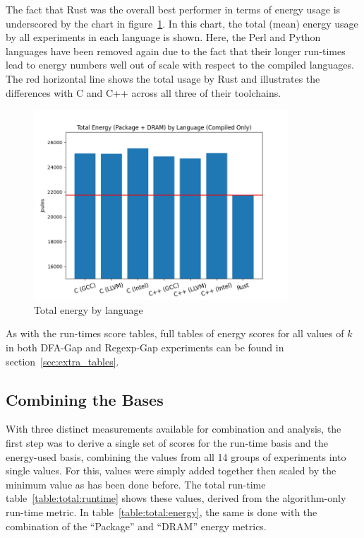 The fact that Rust was the overall best performer in terms of energy usage is underscored by the chart in figure~\ref{fig:graph:total_power_usage}. In this chart, the total (mean) energy usage by all experiments in each language is shown. Here, the Perl and Python languages have been removed again due to the fact that their longer run-times lead to energy numbers well out of scale with respect to the compiled languages. The red horizontal line shows the total usage by Rust and illustrates the differences with C and C++ across all three of their toolchains.

\begin{figure}[h]
	\centering
    \includegraphics[width=0.85\textwidth]{figures/total_power_usage.png}
    \caption{Total energy by language}
    \label{fig:graph:total_power_usage}
\end{figure}

As with the run-times score tables, full tables of energy scores for all values of $k$ in both DFA-Gap and Regexp-Gap experiments can be found in section~\ref{sec:extra_tables}.

\subsection{Combining the Bases}
\label{subsec:combined}

With three distinct measurements available for combination and analysis, the first step was to derive a single set of scores for the run-time basis and the energy-used basis, combining the values from all 14 groups of experiments into single values. For this, values were simply added together then scaled by the minimum value as has been done before. The total run-time table~\ref{table:total:runtime} shows these values, derived from the algorithm-only run-time metric. In table~\ref{table:total:energy}, the same is done with the combination of the ``Package'' and ``DRAM'' energy metrics.

